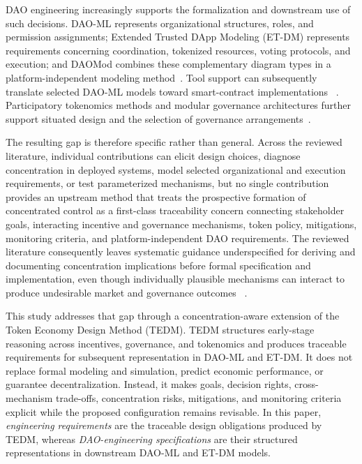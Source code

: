 \documentclass[referee,sn-basic]{sn-jnl}
\begin{document}
DAO engineering increasingly supports the formalization and downstream use of
such decisions. DAO-ML represents organizational structures, roles, and
permission assignments; Extended Trusted DApp Modeling (ET-DM) represents
requirements concerning coordination, tokenized resources, voting protocols,
and execution; and DAOMod combines these complementary diagram types in a
platform-independent modeling method~\cite{Avanzo2024DAOML,
Avanzo2025ExtendingTDM,Avanzo2026DAOMod}. Tool support can subsequently
translate selected DAO-ML models toward smart-contract implementations
~\cite{Avanzo2025DAOMLToSolidity}. Participatory tokenomics methods and modular
governance architectures further support situated design and the selection of
governance arrangements~\cite{Domenicale2026Tokenomics,
Jungnickel2026ModularDAO}.

The resulting gap is therefore specific rather than general. Across the
reviewed literature, individual contributions can elicit design choices,
diagnose concentration in
deployed systems, model selected organizational and execution requirements, or
test parameterized mechanisms, but no single contribution provides an upstream
method that
treats the prospective formation of concentrated control as a first-class
traceability concern connecting stakeholder goals, interacting incentive and
governance mechanisms, token policy, mitigations, monitoring criteria, and
platform-independent DAO requirements. The reviewed literature consequently
leaves systematic guidance underspecified for deriving and documenting
concentration implications before formal
specification and implementation, even though individually plausible
mechanisms can interact to produce undesirable market and governance outcomes
~\cite{Biancotti2022,Drasch2020}.

This study addresses that gap through a concentration-aware extension of the
Token Economy Design Method (TEDM). TEDM structures early-stage reasoning
across incentives, governance, and tokenomics and produces traceable
requirements for subsequent representation in DAO-ML and ET-DM. It does not
replace formal modeling and simulation, predict economic performance, or
guarantee decentralization. Instead, it makes goals, decision rights,
cross-mechanism trade-offs, concentration risks, mitigations, and monitoring
criteria explicit while the proposed configuration remains revisable.
In this paper, \emph{engineering requirements} are the traceable design
obligations produced by TEDM, whereas \emph{DAO-engineering specifications}
are their structured representations in downstream DAO-ML and ET-DM models.
\end{document}
